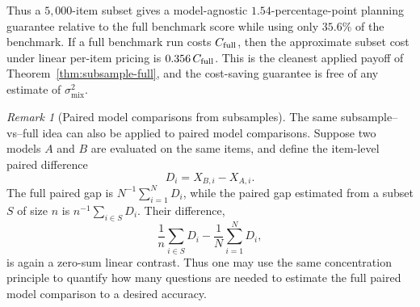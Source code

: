 \documentclass[11pt]{article}
\theoremstyle{definition}
\theoremstyle{remark}
\newtheorem{remark}[theorem]{Remark}
\begin{document}


Thus a \(5{,}000\)-item subset gives a model-agnostic
\(1.54\)-percentage-point planning guarantee relative to the full benchmark score while using only \(35.6\%\) of the benchmark. If a full benchmark run
costs \(C_{\rm full}\), then the approximate subset cost under linear
per-item pricing is $0.356\,C_{\rm full}$. This is the cleanest applied payoff of Theorem~\ref{thm:subsample-full}, and the cost-saving guarantee is free of any estimate of
\(\sigma_{\mathrm{mix}}^2\).

\begin{remark}[Paired model comparisons from subsamples]
The same subsample--vs--full idea can also be applied to paired model
comparisons.  Suppose two models \(A\) and \(B\) are evaluated on the same
items, and define the item-level paired difference
\[
    D_i = X_{B,i}-X_{A,i}.
\]
The full paired gap is \(N^{-1}\sum_{i=1}^N D_i\), while the paired gap
estimated from a subset \(S\) of size \(n\) is \(n^{-1}\sum_{i\in S}D_i\).
Their difference,
\[
    \frac1n\sum_{i\in S}D_i
    -
    \frac1N\sum_{i=1}^N D_i,
\]
is again a zero-sum linear contrast. Thus one may use the same concentration principle to quantify how many questions are needed to estimate the full paired model comparison to a
desired accuracy.
\end{remark}
\end{document}
